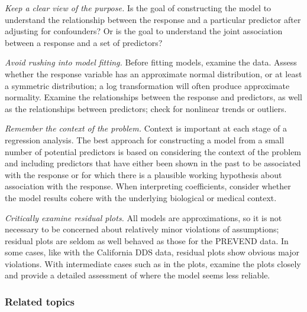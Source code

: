 \begin{description}

	\item \emph{Keep a clear view of the purpose.} Is the goal of constructing the model to understand the relationship between the response and a particular predictor after adjusting for confounders? Or is the goal to understand the joint association between a response and a set of predictors? 
	
	\item \emph{Avoid rushing into model fitting.} Before fitting models, examine the data. Assess whether the response variable has an approximate normal distribution, or at least a symmetric distribution; a log transformation will often produce approximate normality. Examine the relationships between the response and predictors, as well as the relationships between predictors; check for nonlinear trends or outliers. 
	
	\item \emph{Remember the context of the problem.} Context is important at each stage of a regression analysis. The best approach for constructing a model from a small number of potential predictors is based on considering the context of the problem and including predictors that have either been shown in the past to be associated with the response or for which there is a plausible working hypothesis about association with the response. When interpreting coefficients, consider whether the model results cohere with the underlying biological or medical context.
	
	\item \emph{Critically examine residual plots.} All models are approximations, so it is not necessary to be concerned about relatively minor violations of assumptions; residual plots are seldom as well behaved as those for the PREVEND data. In some cases, like with the California DDS data, residual plots show obvious major violations. With intermediate cases such as in the  plots, examine the plots closely and provide a detailed assessment of where the model seems less reliable.

\end{description}


\textD{\newpage}


\subsubsection{Related topics}

